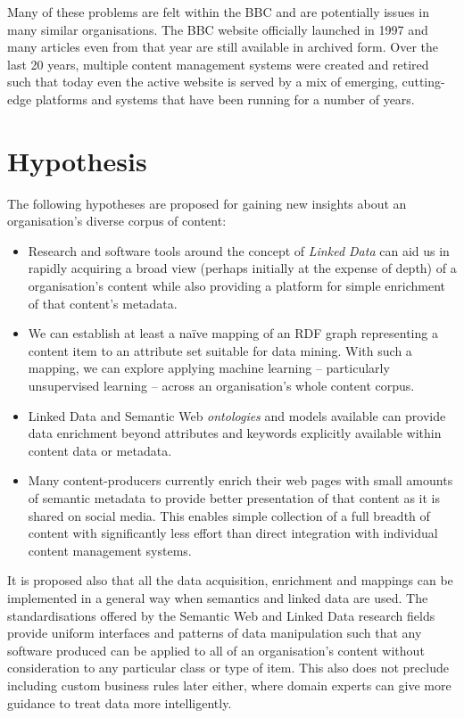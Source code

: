 Many of these problems are felt within the BBC and are potentially
issues in many similar organisations. The BBC website officially
launched in 1997 and many articles even from that year are still available
in archived form. Over the last 20 years, multiple content management
systems were created and retired such that today even the active
website is served by a mix of emerging, cutting-edge platforms and
systems that have been running for a number of years.

\section{Hypothesis}

The following hypotheses are proposed for gaining new insights about
an organisation's diverse corpus of content:

\begin{itemize}

\item Research and software tools around the concept of
  \emph{Linked Data} can aid us in rapidly acquiring a broad view
  (perhaps initially at the expense of depth) of a organisation's
  content while also providing a platform for simple enrichment of
  that content's metadata.

\item We can establish at least a na\"ive mapping of an RDF graph
  representing a content item to an attribute set suitable for data
  mining. With such a mapping, we can explore applying machine
  learning -- particularly unsupervised learning -- across an
  organisation's whole content corpus.

\item Linked Data and Semantic Web \emph{ontologies} and models
  available can provide data enrichment beyond attributes and keywords
  explicitly available within content data or metadata.

\item Many content-producers currently enrich their web pages with
  small amounts of semantic metadata to provide better presentation of
  that content as it is shared on social media. This enables simple
  collection of a full breadth of content with significantly less
  effort than direct integration with individual content management
  systems.

\end{itemize}

It is proposed also that all the data acquisition, enrichment and
mappings can be implemented in a general way when semantics and
linked data are used. The standardisations offered by the Semantic
Web and Linked Data research fields provide uniform interfaces and
patterns of data manipulation such that any software produced can be
applied to all of an organisation's content without consideration to
any particular class or type of item. This also does not preclude
including custom business rules later either, where domain experts
can give more guidance to treat data more intelligently.

